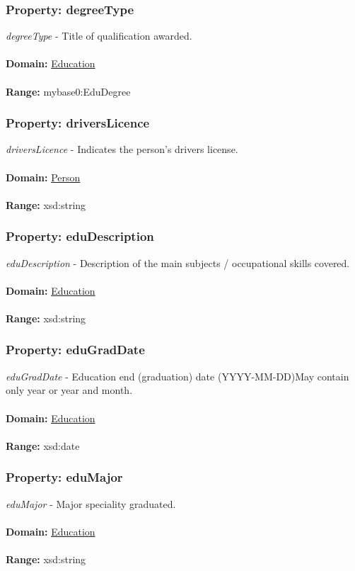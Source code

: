 \documentclass[a4paper,12pt]{article}
\numberwithin{equation}{section}
\begin{document}
\subsubsection{Property: degreeType}\hypertarget{degreeType}{}
\textit{degreeType} - Title of qualification awarded.
\\\\
\textbf{Domain:} \hyperlink{Education}{Education} 
\\\\
\textbf{Range:}  mybase0:EduDegree

\subsubsection{Property: driversLicence}\hypertarget{driversLicence}{}
\textit{driversLicence} - Indicates the person's drivers license.
\\\\
\textbf{Domain:} \hyperlink{Person}{Person} 
\\\\
\textbf{Range:}  xsd:string

\subsubsection{Property: eduDescription}\hypertarget{eduDescription}{}
\textit{eduDescription} - Description of the main subjects / occupational skills covered.
\\\\
\textbf{Domain:} \hyperlink{Education}{Education} 
\\\\
\textbf{Range:}  xsd:string

\subsubsection{Property: eduGradDate}\hypertarget{eduGradDate}{}
\textit{eduGradDate} - Education end (graduation) date (YYYY-MM-DD)May contain only year or year and month.
\\\\
\textbf{Domain:} \hyperlink{Education}{Education} 
\\\\
\textbf{Range:}  xsd:date

\subsubsection{Property: eduMajor}\hypertarget{eduMajor}{}
\textit{eduMajor} - Major speciality graduated.
\\\\
\textbf{Domain:} \hyperlink{Education}{Education} 
\\\\
\textbf{Range:}  xsd:string
\end{document}
